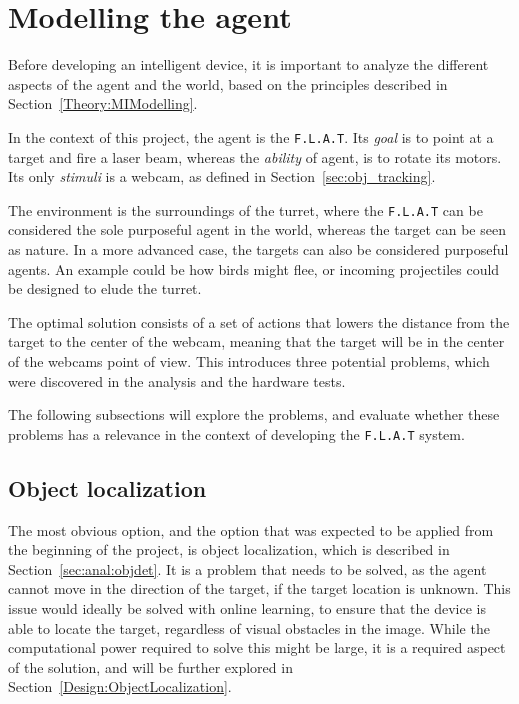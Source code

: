 \section{Modelling the agent}\label{Design:MI}
Before developing an intelligent device, it is important to analyze the different aspects of the agent and the world, based on the principles described in Section~\ref{Theory:MIModelling}.


In the context of this project, the agent is the \texttt{F.L.A.T}.
Its \textit{goal} is to point at a target and fire a laser beam, whereas the \textit{ability} of agent, is to rotate its motors.
Its only \textit{stimuli} is a webcam, as defined in Section~\ref{sec:obj_tracking}.

The environment is the surroundings of the turret, where the \texttt{F.L.A.T} can be considered the sole purposeful agent in the world, whereas the target can be seen as nature.
In a more advanced case, the targets can also be considered purposeful agents.
An example could be how birds might flee, or incoming projectiles could be designed to elude the turret.

The optimal solution consists of a set of actions that lowers the distance from the target to the center of the webcam, meaning that the target will be in the center of the webcams point of view.
This introduces three potential problems, which were discovered in the analysis and the hardware tests.

The following subsections will explore the problems, and evaluate whether these problems has a relevance in the context of developing the \texttt{F.L.A.T} system. 


\subsection{Object localization}

The most obvious option, and the option that was expected to be applied from the beginning of the project, is object localization, which is described in Section~\ref{sec:anal:objdet}.
It is a problem that needs to be solved, as the agent cannot move in the direction of the target, if the target location is unknown.
This issue would ideally be solved with online learning, to ensure that the device is able to locate the target, regardless of visual obstacles in the image.
While the computational power required to solve this might be large, it is a required aspect of the solution, and will be further explored in Section~\ref{Design:ObjectLocalization}.


